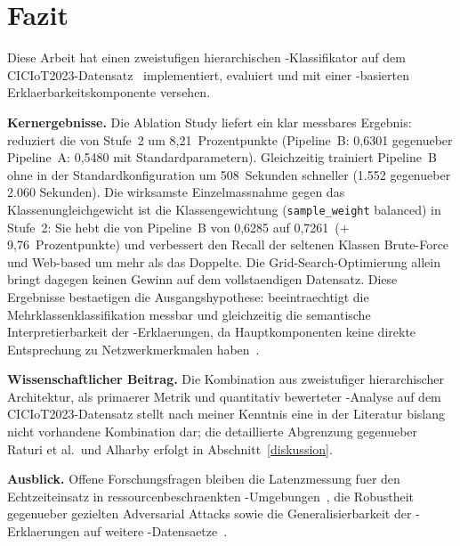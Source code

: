 \section{Fazit}\label{fazit}

Diese Arbeit hat einen zweistufigen hierarchischen \gb{}-Klassifikator auf dem
CICIoT2023-Datensatz~\cite{neto2023ciciot2023} implementiert, evaluiert und mit einer
\shap{}-basierten Erklaerbarkeitskomponente versehen.

\textbf{Kernergebnisse.}
Die Ablation Study liefert ein klar messbares Ergebnis: \pca{} reduziert die \ba{} von
Stufe~2 um 8{,}21~Prozentpunkte (Pipeline~B: 0{,}6301 gegenueber Pipeline~A: 0{,}5480
mit Standardparametern).
Gleichzeitig trainiert Pipeline~B ohne \pca{} in der Standardkonfiguration um 508~Sekunden
schneller (1.552 gegenueber 2.060 Sekunden).
Die wirksamste Einzelmassnahme gegen das Klassenungleichgewicht ist die Klassengewichtung
(\texttt{sample\_weight} balanced) in Stufe~2: Sie hebt die \ba{} von Pipeline~B von
0{,}6285 auf 0{,}7261~($+$9{,}76~Prozentpunkte) und verbessert den Recall der seltenen
Klassen Brute-Force und Web-based um mehr als das Doppelte.
Die Grid-Search-Optimierung allein bringt dagegen keinen Gewinn auf dem vollstaendigen
Datensatz.
Diese Ergebnisse bestaetigen die Ausgangshypothese: \pca{} beeintraechtigt die
Mehrklassenklassifikation messbar und gleichzeitig die semantische Interpretierbarkeit
der \shap{}-Erklaerungen, da Hauptkomponenten keine direkte Entsprechung zu
Netzwerkmerkmalen haben~\cite{alharby2025ciciot}.

\textbf{Wissenschaftlicher Beitrag.}
Die Kombination aus zweistufiger hierarchischer Architektur, \ba{} als primaerer Metrik und
quantitativ bewerteter \shap{}-Analyse auf dem CICIoT2023-Datensatz stellt nach meiner
Kenntnis eine in der Literatur bislang nicht vorhandene Kombination dar; die detaillierte
Abgrenzung gegenueber Raturi et al.\ und Alharby erfolgt in Abschnitt~\ref{diskussion}.

\textbf{Ausblick.}
Offene Forschungsfragen bleiben die Latenzmessung fuer den Echtzeiteinsatz in
ressourcenbeschraenkten \iot{}-Umgebungen~\cite{raturi2026exploratory}, die Robustheit
gegenueber gezielten Adversarial Attacks sowie die Generalisierbarkeit der
\shap{}-Erklaerungen auf weitere \iot{}-Datensaetze~\cite{hamedani2025iotsurvey}.
